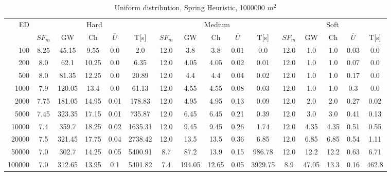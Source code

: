 \begin{table}[htb]
	\centering
	\begin{tabular}{|r|c|c|c|c|c|c|c|c|c|c|c|c|c|c|c|} 
		\multirow{2}{*}{ED} & \multicolumn{5}{c|}{Hard} & \multicolumn{5}{c|}{Medium} &\multicolumn{5}{c|}{Soft} \\ 
		\cline{2-16} 
		&$SF_{m}$&GW & Ch & $\overline{U}$&T[s] &$SF_{m}$&GW & Ch & $\overline{U}$ &T[s] &$SF_{m}$&GW & Ch & $\overline{U}$  & T[s]  \\ 
		\hline 
		100 & 8.25 & 45.15 & 9.55 & 0.0 & 2.0 & 12.0 & 3.8 & 3.8 & 0.01 & 0.0 & 12.0 & 1.0 & 1.0 & 0.03 & 0.0\\ 
		200 & 8.0 & 62.1 & 10.25 & 0.0 & 6.35 & 12.0 & 4.05 & 4.05 & 0.02 & 0.01 & 12.0 & 1.0 & 1.0 & 0.07 & 0.0\\ 
		500 & 8.0 & 81.35 & 12.25 & 0.0 & 20.89 & 12.0 & 4.4 & 4.4 & 0.04 & 0.02 & 12.0 & 1.0 & 1.0 & 0.17 & 0.0\\ 
		1000 & 7.9 & 120.05 & 13.4 & 0.0 & 61.13 & 12.0 & 4.55 & 4.55 & 0.08 & 0.03 & 12.0 & 1.0 & 1.0 & 0.3 & 0.0\\ 
		2000 & 7.75 & 181.05 & 14.95 & 0.01 & 178.83 & 12.0 & 4.95 & 4.95 & 0.13 & 0.09 & 12.0 & 2.0 & 2.0 & 0.27 & 0.02\\ 
		5000 & 7.45 & 323.35 & 17.15 & 0.01 & 735.87 & 12.0 & 6.45 & 6.45 & 0.21 & 0.39 & 12.0 & 3.0 & 3.0 & 0.41 & 0.13\\ 
		10000 & 7.4 & 359.7 & 18.25 & 0.02 & 1635.31 & 12.0 & 9.45 & 9.45 & 0.26 & 1.74 & 12.0 & 4.35 & 4.35 & 0.51 & 0.55\\ 
		20000 & 7.5 & 321.45 & 17.75 & 0.04 & 2738.42 & 12.0 & 13.5 & 13.5 & 0.36 & 6.85 & 12.0 & 6.85 & 6.85 & 0.54 & 1.11\\ 
		50000 & 7.0 & 302.7 & 14.25 & 0.05 & 5400.91 & 8.7 & 87.2 & 13.9 & 0.15 & 986.78 & 12.0 & 12.2 & 12.2 & 0.63 & 6.71\\ 
		100000 & 7.0 & 312.65 & 13.95 & 0.1 & 5401.82 & 7.4 & 194.05 & 12.65 & 0.05 & 3929.75 & 8.9 & 47.05 & 13.3 & 0.16 & 462.8\\ 
		\hline 
	\end{tabular} 
	\caption{Uniform distribution, Spring Heuristic, 1000000 $m^2$} 
	\label{tab:UnRandom1000} 
\end{table} 
